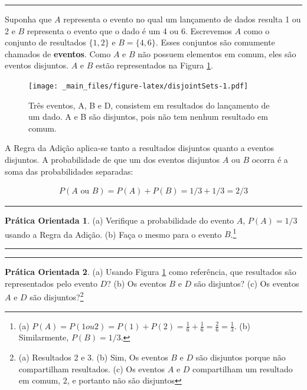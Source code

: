 \documentclass[
]{book}
\theoremstyle{definition}
\theoremstyle{definition}
\theoremstyle{definition}
\newtheorem{exercise}{Prática Orientada}[chapter]
\theoremstyle{definition}
\theoremstyle{remark}
\begin{document}
\begin{center}\rule{0.5\linewidth}{0.5pt}\end{center}

Suponha que \(A\) representa o evento no qual um lançamento de dados resulta 1 ou 2 e \(B\) representa o evento que o dado é um 4 ou 6. Escrevemos \(A\) como o conjunto de resultados \(\{1,2\}\) e \(B = \{4, 6\}\). Esses conjuntos são comumente chamados de \textbf{eventos}. Como \(A\) e \(B\) não possuem elementos em comum, eles são eventos disjuntos. \(A\) e \(B\) estão representados na Figura \ref{fig:disjointSets}.

\begin{figure}
\centering
\texttt{[image: \_main\_files/figure-latex/disjointSets-1.pdf]}
\caption{\label{fig:disjointSets}Três eventos, A, B e D, consistem em resultados do lançamento de um dado. A e B são disjuntos, pois não tem nenhum resultado em comum.}
\end{figure}

A Regra da Adição aplica-se tanto a resultados disjuntos quanto a eventos disjuntos. A probabilidade de que um dos eventos disjuntos \(A\) ou \(B\) ocorra é a soma das probabilidades separadas:

\begin{align*}
P(A\text{ ou }B) = P(A) + P(B) = 1/3 + 1/3 = 2/3
\end{align*}

\begin{center}\rule{0.5\linewidth}{0.5pt}\end{center}

\begin{exercise}
\protect\hypertarget{exr:unnamed-chunk-45}{}{\label{exr:unnamed-chunk-45} }(a) Verifique a probabilidade do evento \(A\), \(P(A) = 1/3\) usando a Regra da Adição.
(b) Faça o mesmo para o evento \(B\).\footnote{(a) \(P(A) = P(1 ou 2) = P(1) + P(2) = \frac{1}{6} + \frac{1}{6} = \frac{2}{6} = \frac{1}{3}\). (b) Similarmente, \(P(B) = 1/3\).}
\end{exercise}

\begin{center}\rule{0.5\linewidth}{0.5pt}\end{center}

\begin{center}\rule{0.5\linewidth}{0.5pt}\end{center}

\begin{exercise}
\protect\hypertarget{exr:exerExaminingDisjointSetsABD}{}{\label{exr:exerExaminingDisjointSetsABD} }(a) Usando Figura \ref{fig:disjointSets} como referência, que resultados são representados pelo evento \(D\)?
(b) Os eventos \(B\) e \(D\) são disjuntos?
(c) Os eventos \(A\) e \(D\) são disjuntos?\footnote{(a) Resultados 2 e 3. (b) Sim, Os eventos \(B\) e \(D\) são disjuntos porque não compartilham resultados. (c) Os eventos \(A\) e \(D\) compartilham um resultado em comum, 2, e portanto não são disjuntos}
\end{exercise}
\end{document}
